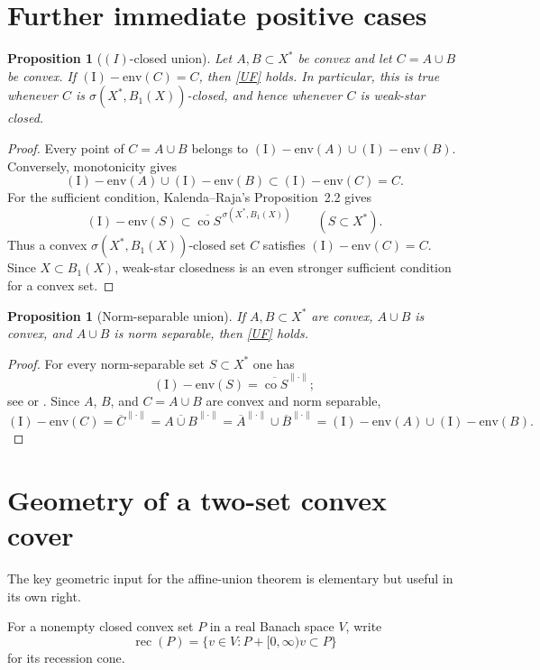 \documentclass[11pt]{article}
\newtheorem{proposition}[theorem]{Proposition}
\theoremstyle{remark}
\newcommand{\Ienv}{\operatorname{(I)\!\!-env}}
\newcommand{\co}{\operatorname{co}}
\newcommand{\rec}{\operatorname{rec}}
\begin{document}
\section{Further immediate positive cases}

\begin{proposition}[$(I)$-closed union]
\label{prop:Iclosed}
Let $A,B\subset X^*$ be convex and let $C=A\cup B$ be convex.  If
$\Ienv(C)=C$, then \eqref{UF} holds.  In particular, this is true whenever
$C$ is $\sigma(X^*,B_1(X))$-closed, and hence whenever $C$ is weak-star
closed.
\end{proposition}

\begin{proof}
Every point of $C=A\cup B$ belongs to $\Ienv(A)\cup\Ienv(B)$.  Conversely,
monotonicity gives
\[
 \Ienv(A)\cup\Ienv(B)\subset\Ienv(C)=C.
\]
For the sufficient condition, Kalenda--Raja's Proposition~2.2 gives
\[
 \Ienv(S)\subset
 \overline{\co S}^{\,\sigma(X^*,B_1(X))}
 \qquad(S\subset X^*).
\]
Thus a convex $\sigma(X^*,B_1(X))$-closed set $C$ satisfies
$\Ienv(C)=C$.  Since $X\subset B_1(X)$, weak-star closedness is an even
stronger sufficient condition for a convex set.
\end{proof}

\begin{proposition}[Norm-separable union]
\label{prop:separable}
If $A,B\subset X^*$ are convex, $A\cup B$ is convex, and $A\cup B$ is norm
separable, then \eqref{UF} holds.
\end{proposition}

\begin{proof}
For every norm-separable set $S\subset X^*$ one has
\[
 \Ienv(S)=\overline{\co S}^{\|\cdot\|};
\]
see \cite[Remark~1.1(ii)]{Kalenda2007} or
\cite[Proposition~4.4(b)]{KR}.  Since $A$, $B$, and $C=A\cup B$ are convex
and norm separable,
\[
 \Ienv(C)=\overline C^{\|\cdot\|}
 =\overline{A\cup B}^{\|\cdot\|}
 =\overline A^{\|\cdot\|}\cup\overline B^{\|\cdot\|}
 =\Ienv(A)\cup\Ienv(B).
\]
\end{proof}

\section{Geometry of a two-set convex cover}

The key geometric input for the affine-union theorem is elementary but
useful in its own right.

For a nonempty closed convex set $P$ in a real Banach space $V$, write
\[
 \rec(P)=\{v\in V: P+[0,\infty)v\subset P\}
\]
for its recession cone.
\end{document}
